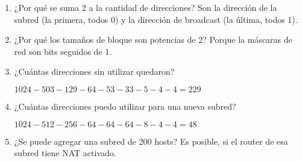 \begin{enumerate}[start=2, left=0cm]
    \item ¿Por qué se suma 2 a la cantidad de direcciones? Son la dirección de la subred (la primera, todos 0) y la dirección de broadcast (la última, todos 1).

    \item ¿Por qué los tamaños de bloque son potencias de 2? Porque la máscaras de red son bits seguidos de 1.

    \item ¿Cuántas direcciones sin utilizar quedaron?
    
    \hfil$1024 - 503 - 129 - 64 - 53 - 33 - 5 - 4 - 4 = 229$\hfil

    \item ¿Cuántas direcciones puedo utilizar para una nueva subred?
    
    \hfil$1024 - 512 - 256 - 64 - 64 - 64 - 8 - 4 - 4 = 48$\hfil

    \item ¿Se puede agregar una subred de 200 hosts? Es posible, si el router de esa subred tiene NAT activado.

\end{enumerate}